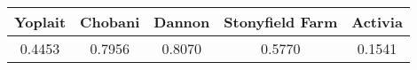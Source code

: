 \begin{tabular}{ccccc}
\hline
Yoplait & Chobani & Dannon & Stonyfield Farm & Activia \\
\hline
0.4453 & 0.7956 & 0.8070 & 0.5770 & 0.1541 \\
\hline
\end{tabular}